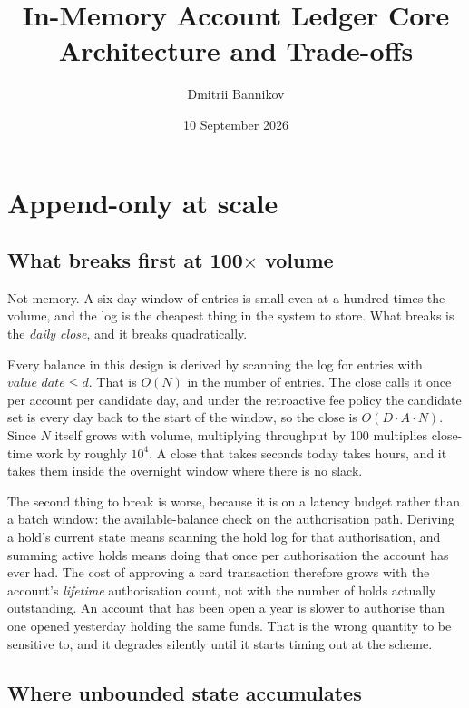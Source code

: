 \documentclass[10pt,a4paper]{article}
\title{\vspace{-8mm}\textbf{\large In-Memory Account Ledger Core}\\[2pt]
\normalsize Architecture and Trade-offs}
\author{\normalsize Dmitrii Bannikov}
\date{\normalsize 10 September 2026}
\newcommand{\term}[1]{\textit{#1}}
\begin{document}
\maketitle
\vspace{-6mm}

\section{Append-only at scale}

\subsection{What breaks first at 100$\times$ volume}

Not memory. A six-day window of entries is small even at a hundred times the
volume, and the log is the cheapest thing in the system to store. What breaks
is the \term{daily close}, and it breaks quadratically.

Every balance in this design is derived by scanning the log for entries with
$\textit{value\_date} \le d$. That is $O(N)$ in the number of entries. The
close calls it once per account per candidate day, and under the retroactive
fee policy the candidate set is every day back to the start of the window, so
the close is $O(D \cdot A \cdot N)$. Since $N$ itself grows with volume,
multiplying throughput by 100 multiplies close-time work by roughly $10^4$. A
close that takes seconds today takes hours, and it takes them inside the
overnight window where there is no slack.

The second thing to break is worse, because it is on a latency budget rather
than a batch window: the available-balance check on the authorisation path.
Deriving a hold's current state means scanning the hold log for that
authorisation, and summing active holds means doing that once per
authorisation the account has ever had. The cost of approving a card
transaction therefore grows with the account's \term{lifetime} authorisation
count, not with the number of holds actually outstanding. An account that has
been open a year is slower to authorise than one opened yesterday holding the
same funds. That is the wrong quantity to be sensitive to, and it degrades
silently until it starts timing out at the scheme.

\subsection{Where unbounded state accumulates}
\end{document}
